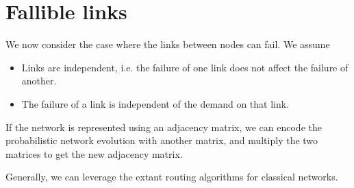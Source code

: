 \documentclass{amsart}
\begin{document}
    \section{Fallible links}

    We now consider the case where the links between nodes can fail. We assume \begin{itemize}
        \item Links are independent, i.e. the failure of one link does not affect the failure of another. 
        \item The failure of a link is independent of the demand on that link.
    \end{itemize}

    If the network is represented using an adjacency matrix, we can encode the probabilistic network evolution with another matrix, and multiply the two matrices to get the new adjacency matrix. 

    Generally, we can leverage the extant routing algorithms for classical networks.
\end{document}
